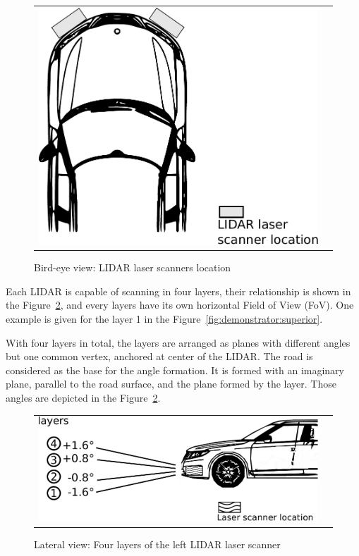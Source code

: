 \begin{figure}[h]
   \centering
     \begin{tabular}{lr}
       \includegraphics[scale=0.3]{img/fig:demonstrator:birdeye}
     \end{tabular}
   \caption{Bird-eye view: LIDAR laser scanners location}
   \label{fig:demonstrator:birdeye}
\end{figure}

Each LIDAR is capable of scanning in four layers, their relationship is shown  in the Figure~\ref{fig:demonstrator:lateral}, and every layers have its own horizontal Field of View (FoV). One example is given for the layer 1 in the Figure~\ref{fig:demonstrator:superior}.

With four layers in total, the layers are arranged as planes with different angles but one common vertex, anchored at center of the LIDAR. The road is considered as the base for the angle formation. It is formed with an imaginary plane, parallel to the road surface, and the plane formed by the layer. Those angles are depicted in the Figure~\ref{fig:demonstrator:lateral}.

\begin{figure}[h]
   \centering
     \begin{tabular}{lr}
       \includegraphics[scale=0.5]{img/fig:demonstrator:lateral}
     \end{tabular}
   \caption{Lateral view: Four layers of the left LIDAR laser scanner}
   \label{fig:demonstrator:lateral}
\end{figure}

